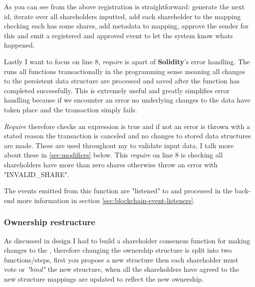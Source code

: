 As you can see from the above registration is straightforward: generate the next id, iterate over all shareholders inputted, add each shareholder to the mapping checking each has some shares, add metadata to mapping, approve the sender for this  and emit a registered and approved event to let the system know whats happened.

Lastly I want to focus on line 8, \textit{require} is apart of \textbf{Solidity}'s error handling. The  runs all functions transactionally in the programming sense meaning all changes to the persistent data structure are processed and saved after the function has completed successfully. This is extremely useful and greatly simplifies error handling because if we encounter an error no underlying changes to the data have taken place and the transaction simply fails. 

\textit{Require} therefore checks an expression is true and if not an error is thrown with a stated reason the transaction is canceled and no changes to stored data structures are made. These are used throughout my  to validate input data, I talk more about these in \ref{sec:modifiers} below. This \textit{require} on line 8 is checking all shareholders have more than zero shares otherwise throw an error with "INVALID\_SHARE".

The events emitted from this function are "listened" to and processed in the back-end more information in section \ref{sec:blockchain-event-listeners}.

\subsubsection{Ownership restructure}

As discussed in  design I had to build a shareholder consensus function for making changes to the , therefore changing the ownership structure is split into two functions/steps, first you propose a new structure then each shareholder must vote or \textit{"bind"} the new structure, when all the shareholders have agreed to the new structure mappings are updated to reflect the new ownership.

